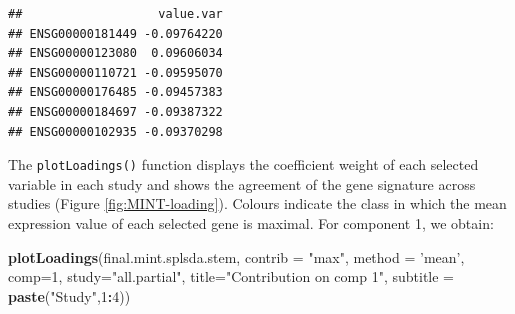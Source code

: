 \documentclass[]{book}
\newenvironment{Shaded}{\begin{snugshade}}{\end{snugshade}}
\newcommand{\KeywordTok}[1]{\textcolor[rgb]{0.13,0.29,0.53}{\textbf{#1}}}
\newcommand{\DataTypeTok}[1]{\textcolor[rgb]{0.13,0.29,0.53}{#1}}
\newcommand{\DecValTok}[1]{\textcolor[rgb]{0.00,0.00,0.81}{#1}}
\newcommand{\StringTok}[1]{\textcolor[rgb]{0.31,0.60,0.02}{#1}}
\newcommand{\OperatorTok}[1]{\textcolor[rgb]{0.81,0.36,0.00}{\textbf{#1}}}
\newcommand{\NormalTok}[1]{#1}
\begin{document}
\begin{verbatim}
##                   value.var
## ENSG00000181449 -0.09764220
## ENSG00000123080  0.09606034
## ENSG00000110721 -0.09595070
## ENSG00000176485 -0.09457383
## ENSG00000184697 -0.09387322
## ENSG00000102935 -0.09370298
\end{verbatim}

The \texttt{plotLoadings()} function displays the coefficient weight of
each selected variable in each study and shows the agreement of the gene
signature across studies (Figure \ref{fig:MINT-loading}). Colours
indicate the class in which the mean expression value of each selected
gene is maximal. For component 1, we obtain:

\begin{Shaded}
\begin{Highlighting}[]
\KeywordTok{plotLoadings}\NormalTok{(final.mint.splsda.stem, }\DataTypeTok{contrib =} \StringTok{"max"}\NormalTok{, }\DataTypeTok{method =} \StringTok{'mean'}\NormalTok{, }\DataTypeTok{comp=}\DecValTok{1}\NormalTok{, }
             \DataTypeTok{study=}\StringTok{"all.partial"}\NormalTok{, }\DataTypeTok{title=}\StringTok{"Contribution on comp 1"}\NormalTok{, }
             \DataTypeTok{subtitle =} \KeywordTok{paste}\NormalTok{(}\StringTok{"Study"}\NormalTok{,}\DecValTok{1}\OperatorTok{:}\DecValTok{4}\NormalTok{))}
\end{Highlighting}
\end{Shaded}
\end{document}
